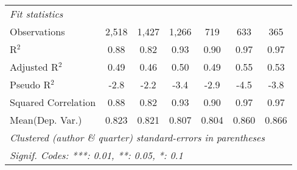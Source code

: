 \begin{tabular}{lcccccc}
   \midrule
   \emph{Fit statistics}\\
   Observations                                               & 2,518   & 1,427         & 1,266          & 719            & 633       & 365\\  
   R$^2$                                                      & 0.88    & 0.82          & 0.93           & 0.90           & 0.97      & 0.97\\  
   Adjusted R$^2$                                             & 0.49    & 0.46          & 0.50           & 0.49           & 0.55      & 0.53\\  
   Pseudo R$^2$                                               & -2.8    & -2.2          & -3.4           & -2.9           & -4.5      & -3.8\\  
   Squared Correlation                                        & 0.88    & 0.82          & 0.93           & 0.90           & 0.97      & 0.97\\  
Mean(Dep. Var.) & 0.823 & 0.821 & 0.807 & 0.804 & 0.860 & 0.866 \\
   \midrule \midrule
   \multicolumn{7}{l}{\emph{Clustered (author \& quarter) standard-errors in parentheses}}\\
   \multicolumn{7}{l}{\emph{Signif. Codes: ***: 0.01, **: 0.05, *: 0.1}}\\
\end{tabular}
\par\endgroup
